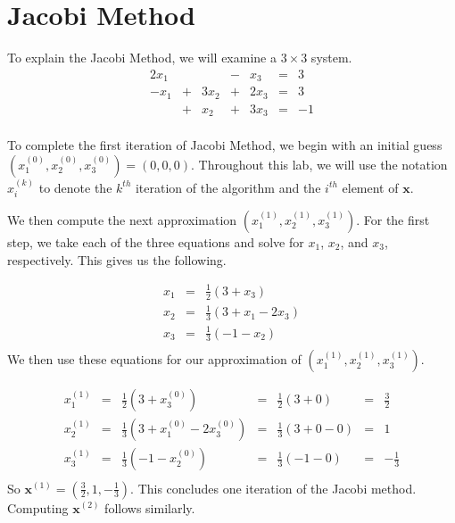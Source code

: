 \section*{Jacobi Method}

To explain the Jacobi Method, we will examine a $ 3 \times 3 $ system.
$$
\begin{matrix}
2x_1 &   &      & - & x_3  & = & 3 \\
-x_1 & + & 3x_2 & + & 2x_3 & = & 3 \\
     & + & x_2  & + & 3x_3 & = & -1 \\
\end{matrix}
$$

To complete the first iteration of Jacobi Method, we begin with an initial guess
$(x^{(0)}_1, x^{(0)}_2, x^{(0)}_3) = (0,0,0)$. Throughout this lab, we will use
 the notation $x^{(k)}_i$ to denote the $k^{th}$ iteration of the algorithm and
 the $i^{th}$ element of $\mathbf{x}$.

We then compute the next approximation $(x^{(1)}_1, x^{(1)}_2, x^{(1)}_3)$.
For the first step, we take each of the three equations and solve for $x_1$,
$x_2$, and $x_3$, respectively. This gives us the following.

$$
\begin{matrix}
x_1 & = & \frac{1}{2} ( 3 + x_3) \\
x_2 & = & \frac{1}{3} ( 3 + x_1 - 2x_3) \\
x_3 & = & \frac{1}{3} ( -1 - x_2) \\
\end{matrix}
$$
We then use these equations for our approximation of $(x^{(1)}_1, x^{(1)}_2, x^{(1)}_3)$.

$$
\begin{matrix}
x^{(1)}_1 & = & \frac{1}{2} ( 3 + x^{(0)}_3)  & = & \frac{1}{2} (3 + 0)     & = & \frac{3}{2} \\
x^{(1)}_2 & = & \frac{1}{3} ( 3 + x^{(0)}_1 - 2x^{(0)}_3) & = & \frac{1}{3} (3 + 0 - 0) & = & 1 \\
x^{(1)}_3 & = & \frac{1}{3} ( -1 - x^{(0)}_2)       & = & \frac{1}{3} (-1 - 0)    & = & -\frac{1}{3} \\
\end{matrix}
$$
So $\mathbf{x}^{(1)} = (\frac{3}{2}, 1, -\frac{1}{3})$. This concludes one iteration of
the Jacobi method. Computing $\mathbf{x}^{(2)}$ follows similarly.

